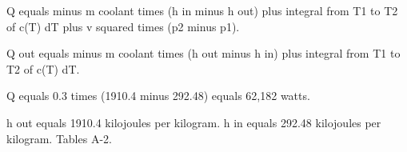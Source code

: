 Q equals minus m coolant times (h in minus h out) plus integral from T1 to T2 of c(T) dT plus v squared times (p2 minus p1).  

Q out equals minus m coolant times (h out minus h in) plus integral from T1 to T2 of c(T) dT.  

Q equals 0.3 times (1910.4 minus 292.48) equals 62,182 watts.  

h out equals 1910.4 kilojoules per kilogram.  
h in equals 292.48 kilojoules per kilogram.  
Tables A-2.